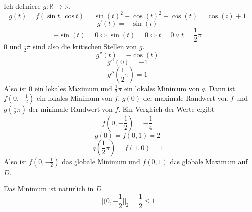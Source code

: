 \documentclass[10pt,a4paper]{article}
\begin{document}
Ich definiere $g: \mathbb{R} \rightarrow \mathbb{R}$.
\begin{equation}
g(t) = f(\sin t, \cos t) = \sin(t)^{2} + \cos(t)^{2} + \cos(t) = \cos(t) + 1
\end{equation}
\begin{equation}
g'(t) = -\sin(t)
\end{equation}
\begin{equation}
-\sin(t) = 0 \Leftrightarrow \sin(t) = 0 \Leftrightarrow t = 0 \lor t = \frac{1}{2}\pi
\end{equation}
$0$ und $\frac{1}{2}\pi$ sind also die kritischen Stellen von $g$.
\begin{equation}
g''(t) = -\cos(t)
\end{equation}
\begin{equation}
g''(0) = -1
\end{equation}
\begin{equation}
g''(\frac{1}{2}\pi) = 1
\end{equation}
Also ist $0$ ein lokales Maximum und $\frac{1}{2}\pi$ ein lokales Minimum von $g$.
Dann ist $f(0, -\frac{1}{2})$ ein lokales Minimum von $f$, $g(0)$ der maximale Randwert von $f$ und $g(\frac{1}{2}\pi)$ der minimale Randwert von $f$.
Ein Vergleich der Werte ergibt
\begin{equation}
f(0, -\frac{1}{2}) = -\frac{1}{4}
\end{equation}
\begin{equation}
g(0) = f(0, 1) = 2
\end{equation}
\begin{equation}
g(\frac{1}{2}\pi) = f(1, 0) = 1
\end{equation}
Also ist $f(0, -\frac{1}{2})$ das globale Minimum und $f(0, 1)$ das globale Maximum auf $D$.

Das Minimum ist natürlich in $D$.
\begin{equation}
||(0, -\frac{1}{2}||_{2} = \frac{1}{2} \le 1
\end{equation}
\end{document}
